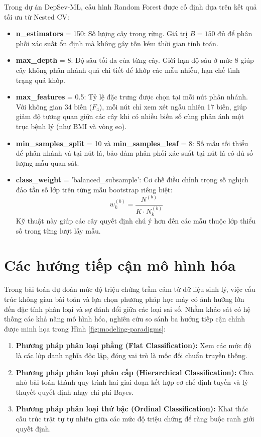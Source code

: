 Trong dự án DepSev-ML, cấu hình Random Forest được cố định dựa trên kết quả tối ưu từ Nested CV:
\begin{itemize}
    \item \textbf{n\_estimators} = 150: Số lượng cây trong rừng. Giá trị $B = 150$ đủ để phân phối xác suất ổn định mà không gây tốn kém thời gian tính toán.
    \item \textbf{max\_depth} = 8: Độ sâu tối đa của từng cây. Giới hạn độ sâu ở mức 8 giúp cây không phân nhánh quá chi tiết để khớp các mẫu nhiễu, hạn chế tình trạng quá khớp.
    \item \textbf{max\_features} = 0.5: Tỷ lệ đặc trưng được chọn tại mỗi nút phân nhánh. Với không gian 34 biến ($F_4$), mỗi nút chỉ xem xét ngẫu nhiên 17 biến, giúp giảm độ tương quan giữa các cây khi có nhiều biến số cùng phản ánh một trục bệnh lý (như BMI và vòng eo).
    \item \textbf{min\_samples\_split} = 10 và \textbf{min\_samples\_leaf} = 8: Số mẫu tối thiểu để phân nhánh và tại nút lá, bảo đảm phân phối xác suất tại nút lá có đủ số lượng mẫu quan sát.
    \item \textbf{class\_weight} = \textnormal{'balanced\_subsample'}: Cơ chế điều chỉnh trọng số nghịch đảo tần số lớp trên từng mẫu bootstrap riêng biệt:
    \begin{equation}
        w_k^{(b)} = \frac{N^{(b)}}{K \cdot N_k^{(b)}}
    \end{equation}
    Kỹ thuật này giúp các cây quyết định chú ý hơn đến các mẫu thuộc lớp thiểu số trong từng lượt lấy mẫu.
\end{itemize}

\section{Các hướng tiếp cận mô hình hóa}
\label{sec:truong-phai-mo-hinh-hoa}

Trong bài toán dự đoán mức độ triệu chứng trầm cảm từ dữ liệu sinh lý, việc cấu trúc không gian bài toán và lựa chọn phương pháp học máy có ảnh hưởng lớn đến đặc tính phân loại và sự đánh đổi giữa các loại sai số. Nhằm khảo sát có hệ thống các khả năng mô hình hóa, nghiên cứu so sánh ba hướng tiếp cận chính được minh họa trong Hình \ref{fig:modeling-paradigms}:
\begin{enumerate}
    \item \textbf{Phương pháp phân loại phẳng (Flat Classification):} Xem các mức độ là các lớp danh nghĩa độc lập, đóng vai trò là mốc đối chuẩn truyền thống.
    \item \textbf{Phương pháp phân loại phân cấp (Hierarchical Classification):} Chia nhỏ bài toán thành quy trình hai giai đoạn kết hợp cơ chế định tuyến và lý thuyết quyết định nhạy chi phí Bayes.
    \item \textbf{Phương pháp phân loại thứ bậc (Ordinal Classification):} Khai thác cấu trúc trật tự tự nhiên giữa các mức độ triệu chứng để ràng buộc ranh giới quyết định.
\end{enumerate}

